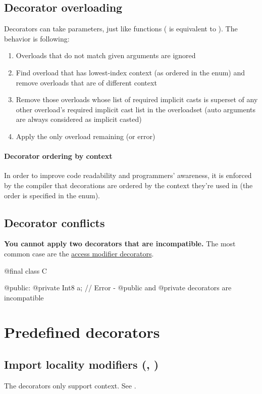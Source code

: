 \subsection{Decorator overloading}
Decorators can take parameters, just like functions ( is equivalent to ). The behavior is following:
\begin{enumerate}
	\item Overloads that do not match given arguments are ignored
	\item Find overload that has lowest-index context (as ordered in the  enum) and remove overloads that are of different context
	\item Remove those overloads whose list of required implicit casts is superset of any other overload's required implicit cast list in the overloadset (auto arguments are always considered as implicit casted)
	\item Apply the only overload remaining (or error)
\end{enumerate}

\paragraph{Decorator ordering by context} In order to improve code readability and programmers' awareness, it is enforced by the compiler that decorations are ordered by the context they're used in (the order is specified in the  enum).

\subsection{Decorator conflicts}
\textbf{You cannot apply two decorators that are incompatible.} The most common case are the \hyperref[accessModifierDecorators]{access modifier decorators}.
\begin{code}
@final class C {

@public:
	@private Int8 a; // Error - @public and @private decorators are incompatible
	
}
\end{code}

\section{Predefined decorators}

\subsection{Import locality modifiers (, )}
The decorators only support  context. See .

